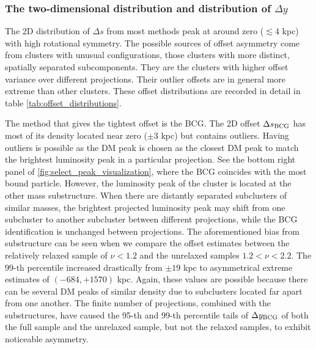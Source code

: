 \subsubsection{The two-dimensional distribution and distribution of $\Delta y$}
The 2D distribution of $\Delta s$ from most methods peak at
around zero ($\lesssim 4$ kpc) with high rotational symmetry. 
The possible sources of offset asymmetry come from clusters with unusual configurations,
those clusters with more distinct, spatially separated subcomponents.
They are the clusters with higher offset variance over different projections. 
Their outlier offsets are in general more extreme than other clusters.
These offset distributions are recorded in detail in table
\ref{tab:offset_distributions}. 

The method that gives the tightest offset is the BCG. 
The 2D offset $\Delta s_{\rm BCG}$ has most of its density located near zero
($\pm 3$ kpc) but 
contains outliers. Having outliers is possible 
as the DM peak is chosen as the closest DM peak to match the
brightest luminosity peak in a particular projection.
See the bottom right panel of \ref{fig:select_peak_visualization}, where the BCG 
coincides with the most bound particle. However, the luminosity peak of the
cluster is located at the other mass substructure. 
When there are distantly separated subclusters of similar masses, 
the brightest projected luminosity peak 
may shift from one subcluster to another subcluster between different projections,
while the BCG identification is unchanged between projections.
The aforementioned bias from substructure can be seen when we compare the
offset estimates between the relatively relaxed sample of $\nu < 1.2$ and the
unrelaxed samples $1.2 < \nu < 2.2$. The 99-th percentile increased drastically
from $\pm 19$ kpc to asymmetrical extreme estimates of $(-684, +1570)$ kpc.
Again, these values are possible because there can be several DM peaks of
similar density due to subclusters located far apart from one another.
The finite number of projections, combined with the substructures, have caused 
the 95-th and 99-th percentile tails of $\Delta y_{\rm BCG}$ of both the full
sample and the unrelaxed sample, but not the relaxed samples, to exhibit 
noticeable asymmetry.

